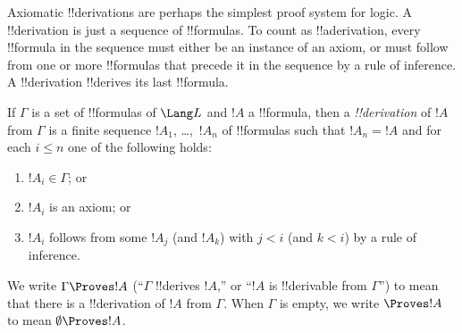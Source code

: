 \documentclass[../../include/open-logic-section]{subfiles}
\begin{document}


\begin{explain}
  Axiomatic !!{derivation}s are perhaps the simplest proof system for
  logic. A !!{derivation} is just a sequence of !!{formula}s.  To
  count as !!a{derivation}, every !!{formula} in the sequence must
  either be an instance of an axiom, or must follow from one or more
  !!{formula}s that precede it in the sequence by a rule of inference.
  A !!{derivation} !!{derive}s its last !!{formula}.
\end{explain}

\begin{defn}[!!^{derivability}]
If $\Gamma$ is a set of !!{formula}s of $\Lang L$ and $!A$ a
!!{formula}, then a \emph{!!{derivation}} of $!A$ from $\Gamma$ is a
finite sequence $!A_1$, \dots,~$!A_n$ of !!{formula}s such that $!A_n
= !A$ and for each $i \le n$ one of the following holds:
\begin{enumerate}
\item $!A_i \in \Gamma$; or
\item $!A_i$ is an axiom; or
\item $!A_i$ follows from some $!A_j$ (and $!A_k$) with $j < i$ (and $k < i$)
  by a rule of inference.
\end{enumerate}
We write $\Gamma \Proves !A$ (``$\Gamma$ !!{derive}s $!A$,'' or ``$!A$
is !!{derivable} from $\Gamma$'') to mean that there is a
!!{derivation} of $!A$ from $\Gamma$. When $\Gamma$ is empty, we write
$\Proves !A$ to mean $\emptyset \Proves !A$.
\end{defn}
\end{document}
